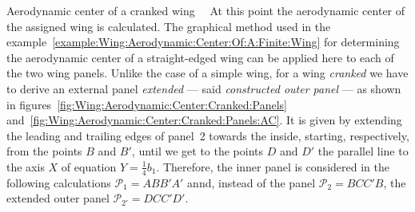 \documentclass[[12pt,twoside]{book}
\begin{document}
\begin{myExampleX}{Aerodynamic center of a cranked wing}{\ \myIconGraph\ }
\medskip
At this point the aerodynamic center of the assigned wing is calculated.
The graphical method used in the example~\ref{example:Wing:Aerodynamic:Center:Of:A:Finite:Wing}
for determining the aerodynamic center of a straight-edged wing
can be applied here to each of the two wing panels.
Unlike the case of a simple wing, for a wing \emph{cranked} we have to derive
an external panel  \emph{extended} --- said \emph{constructed outer panel} --- as shown in
figures~\ref{fig:Wing:Aerodynamic:Center:Cranked:Panels}
and~\ref{fig:Wing:Aerodynamic:Center:Cranked:Panels:AC}. 
It is given by extending the leading and trailing edges
of panel~2 towards the inside,
starting, respectively, from the points $B$ and $B'$, until we get to the points $D$ and $D'$ the parallel line
to the axis $X$ of equation $Y=\frac{1}{4}b_1$.
Therefore, the inner panel is considered in the following calculations
$\mathcal{P}_1=ABB'A'$ annd,
instead of the panel $\mathcal{P}_2=BCC'B$,
the extended outer panel $\mathcal{P}_{2'}=DCC'D'$.


\end{myExampleX}
\end{document}
